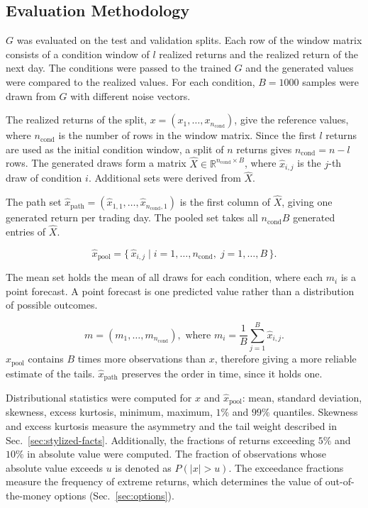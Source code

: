 \subsection{Evaluation Methodology}\label{sec:evaluation}
$G$ was evaluated on the test and validation splits. Each row of the window matrix consists of a condition window of $l$ realized returns and the realized return of the next day. The conditions were passed to the trained $G$ and the generated values were compared to the realized values. For each condition, $B=1000$ samples were drawn from $G$ with different noise vectors. 

The realized returns of the split, $x = (x_1, \ldots, x_{n_{\mathrm{cond}}})$, give the reference values, where $n_{\mathrm{cond}}$ is the number of rows in the window matrix. Since the first $l$ returns are used as the initial condition window, a split of $n$ returns gives $n_{\mathrm{cond}} = n - l$ rows.
The generated draws form a matrix $\hat{X} \in \mathbb{R}^{n_{\mathrm{cond}} \times B}$, where $\hat{x}_{i,j}$ is the $j$-th draw of condition $i$. Additional sets were derived from $\hat{X}$. 

The path set $\hat{x}_{\mathrm{path}} = (\hat{x}_{1,1}, \ldots, \hat{x}_{n_{\mathrm{cond}},1})$ is the first column of $\hat{X}$, giving one generated return per trading day.
The pooled set takes all $n_{\mathrm{cond}}B$ generated entries of $\hat{X}$.

\begin{equation}
    \hat{x}_{\mathrm{pool}} = \{\, \hat{x}_{i,j} \;|\;
    i = 1, \ldots, n_{\mathrm{cond}}, \; j = 1, \ldots, B \,\}.
\end{equation}
 
The mean set holds the mean of all draws for each condition, where each $m_i$ is a point forecast. A point forecast is one predicted value rather than a distribution of possible outcomes.

\begin{equation}
    m = (m_1, \ldots, m_{n_{\mathrm{cond}}}), 
    \text{ where }
    m_i = \frac{1}{B} \sum_{j=1}^{B} \hat{x}_{i,j}.
\end{equation}
$\hat{x}_{\mathrm{pool}}$ contains $B$ times more observations than $x$, therefore giving a more reliable estimate of the tails. $\hat{x}_{\mathrm{path}}$ preserves the order in time, since it holds one.

Distributional statistics were computed for $x$ and $\hat{x}_{\mathrm{pool}}$: mean, standard deviation, skewness, excess kurtosis, minimum, maximum, $1\%$ and $99\%$ quantiles. Skewness and excess kurtosis measure the asymmetry and the tail weight described in Sec.~\ref{sec:stylized-facts}. Additionally, the fractions of returns exceeding $5\%$ and $10\%$ in absolute value were computed. The fraction of observations whose absolute value exceeds $u$ is denoted as $P(|x| > u)$. The exceedance fractions measure the frequency of extreme returns, which determines the value of out-of-the-money options (Sec.~\ref{sec:options}).

